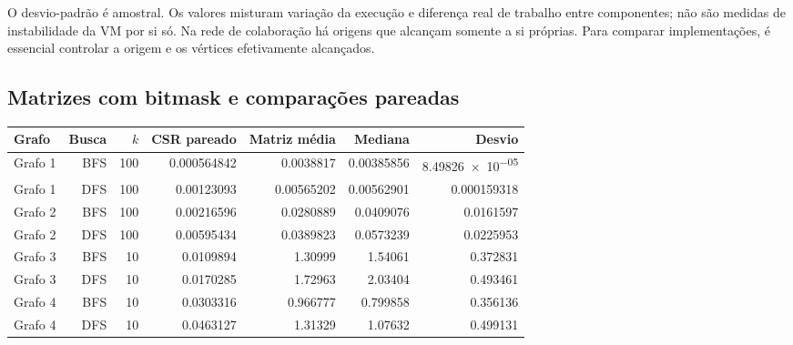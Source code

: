 \documentclass[a4paper,12pt]{article}
\begin{document}
O desvio-padrão é amostral. Os valores misturam variação da execução e diferença real de trabalho entre componentes; não são medidas de instabilidade da VM por si só. Na rede de colaboração há origens que alcançam somente a si próprias. Para comparar implementações, é essencial controlar a origem e os vértices efetivamente alcançados.
\clearpage\subsection{Matrizes com bitmask e comparações pareadas}
\par\smallskip\noindent\begin{minipage}{\textwidth}\centering
\begingroup\fontsize{8.8}{11}\selectfont
\setlength{\tabcolsep}{4pt}
\begin{tabular}{lrrrrrr}
\toprule
Grafo & Busca & $k$ & CSR pareado & Matriz média & Mediana & Desvio \\
\midrule
Grafo 1 & BFS & 100 & \num{0.000564842} & \num{0.0038817} & \num{0.00385856} & \num{8.49826e-05} \\
Grafo 1 & DFS & 100 & \num{0.00123093} & \num{0.00565202} & \num{0.00562901} & \num{0.000159318} \\
Grafo 2 & BFS & 100 & \num{0.00216596} & \num{0.0280889} & \num{0.0409076} & \num{0.0161597} \\
Grafo 2 & DFS & 100 & \num{0.00595434} & \num{0.0389823} & \num{0.0573239} & \num{0.0225953} \\
Grafo 3 & BFS & 10 & \num{0.0109894} & \num{1.30999} & \num{1.54061} & \num{0.372831} \\
Grafo 3 & DFS & 10 & \num{0.0170285} & \num{1.72963} & \num{2.03404} & \num{0.493461} \\
Grafo 4 & BFS & 10 & \num{0.0303316} & \num{0.966777} & \num{0.799858} & \num{0.356136} \\
Grafo 4 & DFS & 10 & \num{0.0463127} & \num{1.31329} & \num{1.07632} & \num{0.499131} \\
\bottomrule
\end{tabular}
\endgroup
{}
\end{minipage}\par\smallskip
\end{document}
